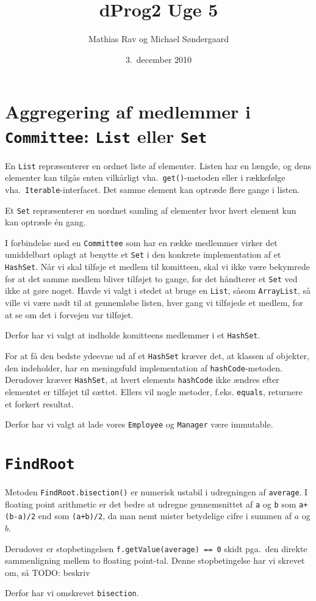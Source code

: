 \documentclass{article}
\author{Mathias Rav og Michael Søndergaard}
\title{dProg2 Uge 5}
\date{3.\ december 2010}
\newcommand{\Committee}{\texttt{Committee}}
\newcommand{\Employee}{\texttt{Employee}}
\newcommand{\Manager}{\texttt{Manager}}
\newcommand{\FindRoot}{\texttt{FindRoot}}
\newcommand{\ArrayList}{\texttt{ArrayList}}
\newcommand{\List}{\texttt{List}}
\newcommand{\Set}{\texttt{Set}}
\newcommand{\HashSet}{\texttt{HashSet}}
\newcommand{\hashCode}{\texttt{hashCode}}
\newcommand{\equals}{\texttt{equals}}
\begin{document}
\maketitle
\section{Aggregering af medlemmer i \Committee: \List{} eller \Set}
En \List{} repræsenterer en ordnet liste af elementer. Listen har en længde, og
dens elementer kan tilgås enten vilkårligt vha.\ \texttt{get()}-metoden eller i
rækkefølge vha.\ \texttt{Iterable}-interfacet. Det samme element kan optræde
flere gange i listen.

Et \Set{} repræsenterer en uordnet samling af elementer hvor hvert element kun
kan optræde \'en gang.

I forbindelse med en \Committee{} som har en række medlemmer virker det
umiddelbart oplagt at benytte et \Set{} i den konkrete implementation af et
\HashSet. Når vi skal tilføje et medlem til komitteen, skal vi ikke være
bekymrede for at det samme medlem bliver tilføjet to gange, for det håndterer
et \Set{} ved ikke at gøre noget. Havde vi valgt i stedet at bruge en \List,
såsom \ArrayList, så ville vi være nødt til at gennemløbe listen, hver gang vi
tilføjede et medlem, for at se om det i forvejen var tilføjet.

Derfor har vi valgt at indholde komitteens medlemmer i et \HashSet.

For at få den bedste ydeevne ud af et \HashSet{} kræver det, at klassen af
objekter, den indeholder, har en meningsfuld implementation af
\hashCode-metoden. Derudover kræver \HashSet{}, at hvert elements \hashCode{}
ikke ændres efter elementet er tilføjet til sættet. Ellers vil nogle metoder,
f.eks. \equals, returnere et forkert resultat.

Derfor har vi valgt at lade vores \Employee{} og \Manager{} være immutable.
\section{\FindRoot}
Metoden \texttt{FindRoot.bisection()} er numerisk ustabil i udregningen af
\texttt{average}. I floating point arithmetic er det bedre at udregne
gennemsnittet af \texttt{a} og \texttt{b} som \texttt{a+(b-a)/2} end som
\texttt{(a+b)/2}, da man nemt mister betydelige cifre i summen af $a$ og $b$.

Derudover er stopbetingelsen \texttt{f.getValue(average) == 0} skidt pga.\ den
direkte sammenligning mellem to floating point-tal. Denne stopbetingelse har vi
skrevet om, så TODO: beskriv

Derfor har vi omskrevet \texttt{bisection}. 
\end{document}
